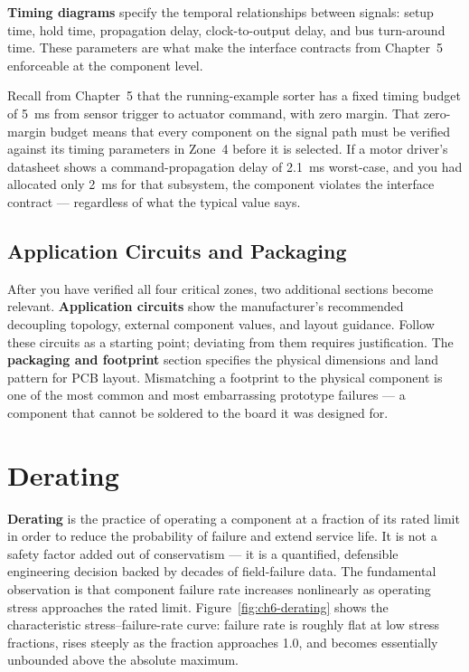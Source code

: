 \textbf{Timing diagrams} specify the temporal relationships between signals: setup time, hold time, propagation delay, clock-to-output delay, and bus turn-around time.
These parameters are what make the interface contracts from Chapter~5 enforceable at the component level.

Recall from Chapter~5 that the running-example sorter has a fixed timing budget of 5~ms from sensor trigger to actuator command, with zero margin.
That zero-margin budget means that every component on the signal path must be verified against its timing parameters in Zone~4 before it is selected.
If a motor driver's datasheet shows a command-propagation delay of 2.1~ms worst-case, and you had allocated only 2~ms for that subsystem, the component violates the interface contract --- regardless of what the typical value says.

\subsection{Application Circuits and Packaging}
\label{sec:ch6-app-pkg}

After you have verified all four critical zones, two additional sections become relevant.
\textbf{Application circuits} show the manufacturer's recommended decoupling topology, external component values, and layout guidance.
Follow these circuits as a starting point; deviating from them requires justification.
The \textbf{packaging and footprint} section specifies the physical dimensions and land pattern for PCB layout.
Mismatching a footprint to the physical component is one of the most common and most embarrassing prototype failures --- a component that cannot be soldered to the board it was designed for.

\section{Derating}
\label{sec:ch6-derating}

\textbf{Derating} is the practice of operating a component at a fraction of its rated limit in order to reduce the probability of failure and extend service life.
It is not a safety factor added out of conservatism --- it is a quantified, defensible engineering decision backed by decades of field-failure data.
The fundamental observation is that component failure rate increases nonlinearly as operating stress approaches the rated limit.
Figure~\ref{fig:ch6-derating} shows the characteristic stress--failure-rate curve: failure rate is roughly flat at low stress fractions, rises steeply as the fraction approaches 1.0, and becomes essentially unbounded above the absolute maximum.

